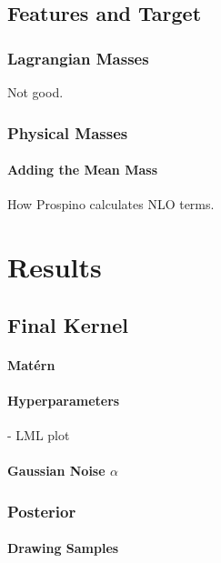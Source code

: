 \documentclass[twoside,english]{uiofysmaster}
\begin{document}
\section{Features and Target}

\subsection{Lagrangian Masses}

Not good.

\subsection{Physical Masses}

\subsubsection{Adding the Mean Mass}

How Prospino calculates NLO terms.




\chapter{Results}

\section{Final Kernel}

\subsubsection{Mat\'{e}rn}

\subsubsection{Hyperparameters}

- LML plot

\subsubsection{Gaussian Noise $\alpha$}

\subsection{Posterior}

\subsubsection{Drawing Samples}
\end{document}
